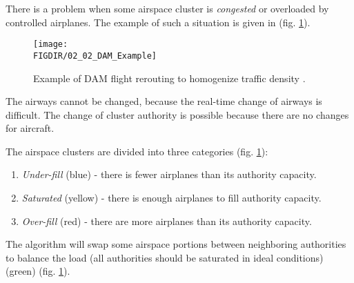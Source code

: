 There is a problem when some airspace cluster is \emph{congested} or overloaded by controlled airplanes. The example of such a situation is given in (fig. \ref{fig:DAMExample}). 

\begin{figure}[H]
    \centering
    \texttt{[image: \\FIGDIR/02\_02\_DAM\_Example]}
    \caption{Example of DAM flight rerouting to homogenize traffic density \cite{gerdes2016dynamic}.}
    \label{fig:DAMExample}
\end{figure}

\begin{note}
    The airways cannot be changed, because the real-time change of airways is difficult. The change of cluster authority is possible because there are no changes for aircraft.
\end{note}

\noindent The airspace clusters are divided into three categories (fig. \ref{fig:DAMExample}):
\begin{enumerate}
    \item \emph{Under-fill} (blue) - there is fewer airplanes than its authority capacity.
    
    \item \emph{Saturated} (yellow) - there is enough airplanes to fill authority capacity.
    
    \item \emph{Over-fill} (red) - there are more airplanes than its authority capacity.
\end{enumerate}


\noindent The algorithm \cite{gerdes2016dynamic} will swap some airspace portions between neighboring authorities to balance the load (all authorities should be saturated in ideal conditions) (green) (fig. \ref{fig:DAMExample}).